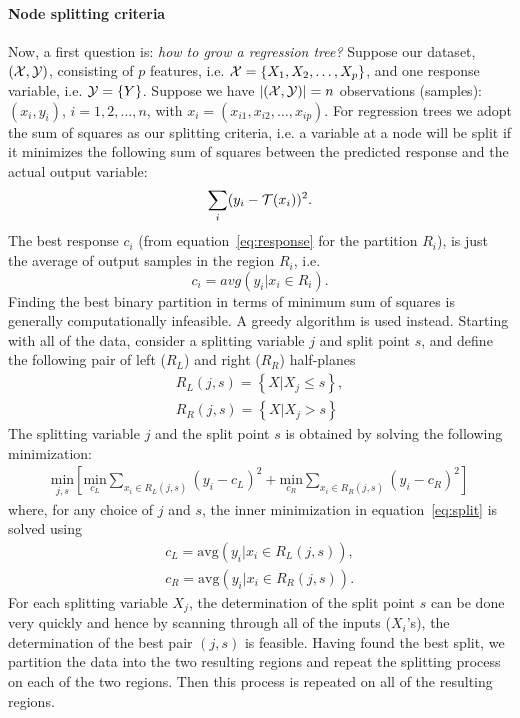 \textcolor[rgb]{0,0,1}{
\paragraph{\textbf{Node splitting criteria}}
Now, a first question is: \emph{how to grow a regression tree?}
Suppose our dataset, $(\mathcal{X},\mathcal{Y})$, consisting of $p$ features, i.e. $\mathcal{X} = \{X_1,X_2,\ldots,X_p\}$, and one response variable, i.e. $\mathcal{Y} = \{Y\}$. Suppose we have $|(\mathcal{X},\mathcal{Y})| = n$ observations (samples): $(x_i,y_i)$, $i=1,2,\ldots,n$, with $x_i=(x_{i1},x_{i2},\ldots,x_{ip})$.
For regression trees we adopt the sum of squares as our splitting criteria, i.e. a variable at a node will be split if it minimizes the following sum of squares between the predicted response and the actual output variable:
\begin{equation}
\sum_i (y_i - \mathcal{T}(x_i))^2.
\end{equation}
The best response $c_i$ (from equation~\ref{eq:response} for the partition $R_i$), is just the average of output samples in the region $R_i$, i.e.
\begin{equation}
c_i = avg(y_i|x_i \in R_i).
\label{eq:average}
\end{equation}
Finding the best binary partition in terms of minimum sum of squares is generally computationally infeasible. 
A greedy algorithm is used instead. Starting with all of the data, consider a splitting variable $j$ and split point $s$, and define the following pair of left ($R_L$) and right ($R_R$) half-planes
\begin{equation}
\begin{aligned}
R_L(j,s) = \left\lbrace X|X_j \leq s \right\rbrace ,\\
R_R(j,s) = \left\lbrace X|X_j > s \right\rbrace
\end{aligned}
\end{equation}
The splitting variable $j$ and the split point $s$ is obtained by solving the following minimization:
\begin{equation}
\begin{aligned}
\underset{j,s}{\text{min}}\left[\underset{c_L}{\text{min}} \sum_{x_i\in R_L(j,s)} (y_i - c_L)^2 + \underset{c_R}{\text{min}} \sum_{x_i\in R_R(j,s)} (y_i - c_R)^2 \right]  
\end{aligned}
\label{eq:split}
\end{equation}
where, for any choice of $j$ and $s$, the inner minimization in equation~\ref{eq:split} is solved using
\begin{equation}
\begin{aligned}
c_L = \text{avg}(y_i|x_i \in R_L(j,s)),\\
c_R = \text{avg}(y_i|x_i \in R_R(j,s)).
\end{aligned}
\end{equation}
For each splitting variable $X_j$, the determination of the split point $s$ can be done very quickly and hence by scanning through all of the inputs ($X_i$'s), the determination of the best pair $(j, s)$ is feasible.
Having found the best split, we partition the data into the two resulting regions and repeat the splitting process on each of the two regions. Then this process is repeated on all of the resulting regions.}


